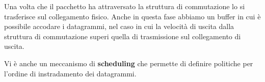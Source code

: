 Una volta che il pacchetto ha attraversato la struttura di commutazione
lo si trasferisce sul collegamento fisico. Anche in questa fase abbiamo
un buffer in cui è possibile accodare i datagrammi, nel caso in cui 
la velocità di uscita dalla struttura di commutazione superi quella 
di trasmissione sul collegamento di uscita.

Vi è anche un meccanismo di \textbf{scheduling} che permette di 
definire politiche per l'ordine di instradamento dei datagrammi.

